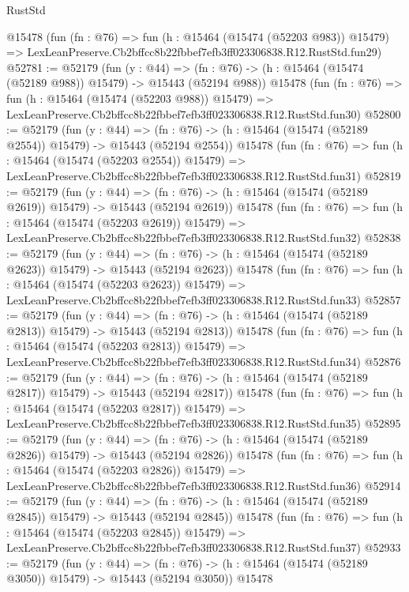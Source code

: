 \begin{lexlean}{RustStd}
\begin{coremodule}
    @15478
    (fun (fn : @76) =>
    fun (h : @15464 (@15474 (@52203 @983)) @15479) =>
    LexLeanPreserve.Cb2bffcc8b22fbbef7efb3ff023306838.R12.RustStd.fun29)
@52781 := @52179
    (fun (y : @44) =>
    (fn : @76) -> (h : @15464 (@15474 (@52189 @988)) @15479) -> @15443 (@52194 @988))
    @15478
    (fun (fn : @76) =>
    fun (h : @15464 (@15474 (@52203 @988)) @15479) =>
    LexLeanPreserve.Cb2bffcc8b22fbbef7efb3ff023306838.R12.RustStd.fun30)
@52800 := @52179
    (fun (y : @44) =>
    (fn : @76) -> (h : @15464 (@15474 (@52189 @2554)) @15479) -> @15443 (@52194 @2554))
    @15478
    (fun (fn : @76) =>
    fun (h : @15464 (@15474 (@52203 @2554)) @15479) =>
    LexLeanPreserve.Cb2bffcc8b22fbbef7efb3ff023306838.R12.RustStd.fun31)
@52819 := @52179
    (fun (y : @44) =>
    (fn : @76) -> (h : @15464 (@15474 (@52189 @2619)) @15479) -> @15443 (@52194 @2619))
    @15478
    (fun (fn : @76) =>
    fun (h : @15464 (@15474 (@52203 @2619)) @15479) =>
    LexLeanPreserve.Cb2bffcc8b22fbbef7efb3ff023306838.R12.RustStd.fun32)
@52838 := @52179
    (fun (y : @44) =>
    (fn : @76) -> (h : @15464 (@15474 (@52189 @2623)) @15479) -> @15443 (@52194 @2623))
    @15478
    (fun (fn : @76) =>
    fun (h : @15464 (@15474 (@52203 @2623)) @15479) =>
    LexLeanPreserve.Cb2bffcc8b22fbbef7efb3ff023306838.R12.RustStd.fun33)
@52857 := @52179
    (fun (y : @44) =>
    (fn : @76) -> (h : @15464 (@15474 (@52189 @2813)) @15479) -> @15443 (@52194 @2813))
    @15478
    (fun (fn : @76) =>
    fun (h : @15464 (@15474 (@52203 @2813)) @15479) =>
    LexLeanPreserve.Cb2bffcc8b22fbbef7efb3ff023306838.R12.RustStd.fun34)
@52876 := @52179
    (fun (y : @44) =>
    (fn : @76) -> (h : @15464 (@15474 (@52189 @2817)) @15479) -> @15443 (@52194 @2817))
    @15478
    (fun (fn : @76) =>
    fun (h : @15464 (@15474 (@52203 @2817)) @15479) =>
    LexLeanPreserve.Cb2bffcc8b22fbbef7efb3ff023306838.R12.RustStd.fun35)
@52895 := @52179
    (fun (y : @44) =>
    (fn : @76) -> (h : @15464 (@15474 (@52189 @2826)) @15479) -> @15443 (@52194 @2826))
    @15478
    (fun (fn : @76) =>
    fun (h : @15464 (@15474 (@52203 @2826)) @15479) =>
    LexLeanPreserve.Cb2bffcc8b22fbbef7efb3ff023306838.R12.RustStd.fun36)
@52914 := @52179
    (fun (y : @44) =>
    (fn : @76) -> (h : @15464 (@15474 (@52189 @2845)) @15479) -> @15443 (@52194 @2845))
    @15478
    (fun (fn : @76) =>
    fun (h : @15464 (@15474 (@52203 @2845)) @15479) =>
    LexLeanPreserve.Cb2bffcc8b22fbbef7efb3ff023306838.R12.RustStd.fun37)
@52933 := @52179
    (fun (y : @44) =>
    (fn : @76) -> (h : @15464 (@15474 (@52189 @3050)) @15479) -> @15443 (@52194 @3050))
    @15478

\end{coremodule}
\end{lexlean}
